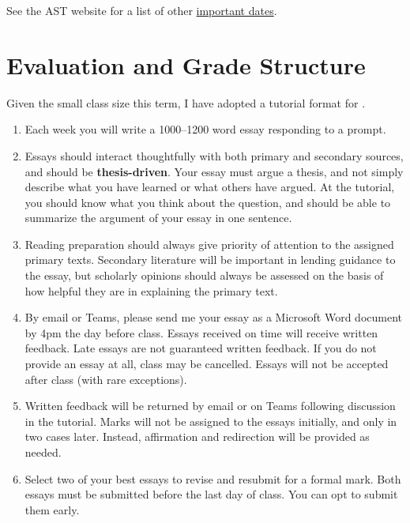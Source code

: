 \documentclass[titlepage]{article}
\begin{document}
See the AST website for a list of other \href{http://www.astheology.ns.ca/students/academic-dates.html}{important dates}.

\section{Evaluation and Grade Structure}
\label{evaluation}

Given the small class size this term, I have adopted a tutorial format
for \ccode.

\begin{enumerate}

	\item Each week you will write a 1000–1200 word essay responding to
	a prompt.

	\item Essays should interact thoughtfully with both primary and
	secondary sources, and should be \textbf{thesis-driven}. Your essay
	must argue a thesis, and not simply describe what you have learned
	or what others have argued. At the tutorial, you should know what
	you think about the question, and should be able to summarize the
	argument of your essay in one sentence.

	\item Reading preparation should always give priority of attention
	to the assigned primary texts. Secondary literature will be
	important in lending guidance to the essay, but scholarly opinions
	should always be assessed on the basis of how helpful they are in
	explaining the primary text.

	\item By email or Teams, please send me your essay as a Microsoft
	Word document by 4pm the day before class. Essays received on time
	will receive written feedback. Late essays are not guaranteed
	written feedback. If you do not provide an essay at all, class may
	be cancelled. Essays will not be accepted after class (with rare
	exceptions).

	\item Written feedback will be returned by email or on Teams
	following discussion in the tutorial. Marks will not be assigned to
	the essays initially, and only in two cases later. Instead,
	affirmation and redirection will be provided as needed.

	\item Select two of your best essays to revise and resubmit for a
	formal mark. Both essays must be submitted before the last day of
	class. You can opt to submit them early.

\end{enumerate}
\end{document}

